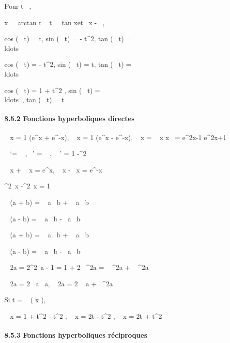 \documentclass[]{article}
\begin{document}
Pour t \in {}~,

x = arctan t \mathrel\Leftrightarrow~ t
= tan x\text et ~x \in{]} -
\pi~,\pi~\diagup2{[}

cos (\arccos~ t) = t,
sin (\arccos~ t) =
 - t^2,
tan (\arccos~ t) =
\\ldots~

cos (\arcsin~ t) =
 - t^2,
sin (\arcsin~ t) = t,
tan (\arcsin~ t) =
\\ldots~

cos (\arctan~ t) = 1
\over {} + t^2 ,
sin (\arctan~ t) =
\\ldots~,
tan (\arctan~ t) = t

\paragraph{8.5.2 Fonctions hyperboliques directes}

\mathrmch~ x = 1
 (e^x + e^-x),
\mathrmsh~ x = 1
 (e^x - e^-x),
\mathrmth~ x =
\mathrmsh~ x
\over
\mathrmch x~ =
e^2x-1 \over e^2x+1

 \mathrmch~
`= \mathrmsh~ ,
\mathrmsh~'
= \mathrmch~ ,
\mathrmth~ ' = 1
-\mathrmth ^2~

 \mathrmch~ x
+ \mathrmsh~ x =
e^x, \mathrmch~ x
-\mathrmsh~ x =
e^-x

 \mathrmch ^2~x
-\mathrmsh ^2~x =
1

\mathrmch~ (a + b)
= \mathrmch~
a\mathrmch~ b
+ \mathrmsh~
a\mathrmsh~ b

\mathrmch~ (a - b)
= \mathrmch~
a\mathrmch~ b
-\mathrmsh~
a\mathrmsh~ b

\mathrmsh~ (a + b)
= \mathrmsh~
a\mathrmch~ b
+ \mathrmch~
a\mathrmsh~ b

\mathrmsh~ (a - b)
= \mathrmsh~
a\mathrmch~ b
-\mathrmch~
a\mathrmsh~ b

\mathrmch~ 2a =
2\mathrmch ^2~a -
1 = 1 + 2\mathrmsh~
^2a = \mathrmch~
^2a + \mathrmsh~
^2a

\mathrmsh~ 2a =
2\mathrmsh~
a\mathrmch~ a,
\mathrmth~ 2a =
2 \mathrmth~ a
+\mathrmth~
^2a

Si t = \mathrmth~ ( x
 ),

\mathrmch~ x = 1 +
t^2  - t^2 ,
\mathrmsh~ x = 2t
 - t^2 ,
\mathrmth~ x = 2t
 + t^2

\paragraph{8.5.3 Fonctions hyperboliques réciproques}
\end{document}
